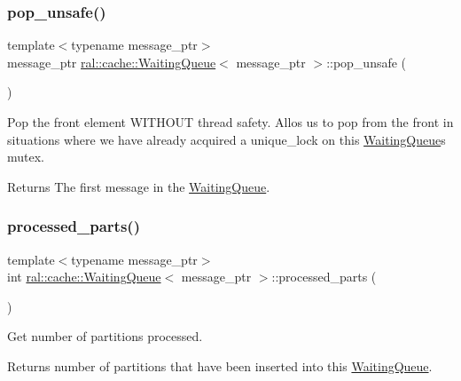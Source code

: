 \subsubsection{\texorpdfstring{pop\+\_\+unsafe()}{pop\_unsafe()}}
{\footnotesize\ttfamily template$<$typename message\+\_\+ptr$>$ \\
message\+\_\+ptr \hyperlink{classral_1_1cache_1_1WaitingQueue}{ral\+::cache\+::\+Waiting\+Queue}$<$ message\+\_\+ptr $>$\+::pop\+\_\+unsafe (\begin{DoxyParamCaption}{ }\end{DoxyParamCaption})\hspace{0.3cm}{\ttfamily [inline]}}

Pop the front element W\+I\+T\+H\+O\+UT thread safety. Allos us to pop from the front in situations where we have already acquired a unique\+\_\+lock on this \hyperlink{classral_1_1cache_1_1WaitingQueue}{Waiting\+Queue}\textquotesingle{}s mutex. \begin{DoxyReturn}{Returns}
The first message in the \hyperlink{classral_1_1cache_1_1WaitingQueue}{Waiting\+Queue}. 
\end{DoxyReturn}
\mbox{\label{classral_1_1cache_1_1WaitingQueue_af3afa691f12cfe644d86e8c1f99a31ec}} 
\subsubsection{\texorpdfstring{processed\+\_\+parts()}{processed\_parts()}}
{\footnotesize\ttfamily template$<$typename message\+\_\+ptr$>$ \\
int \hyperlink{classral_1_1cache_1_1WaitingQueue}{ral\+::cache\+::\+Waiting\+Queue}$<$ message\+\_\+ptr $>$\+::processed\+\_\+parts (\begin{DoxyParamCaption}{ }\end{DoxyParamCaption})\hspace{0.3cm}{\ttfamily [inline]}}

Get number of partitions processed. \begin{DoxyReturn}{Returns}
number of partitions that have been inserted into this \hyperlink{classral_1_1cache_1_1WaitingQueue}{Waiting\+Queue}. 
\end{DoxyReturn}
\mbox{\label{classral_1_1cache_1_1WaitingQueue_a8049784eaf2ca3f33b3ed9accd2222d2}} 
